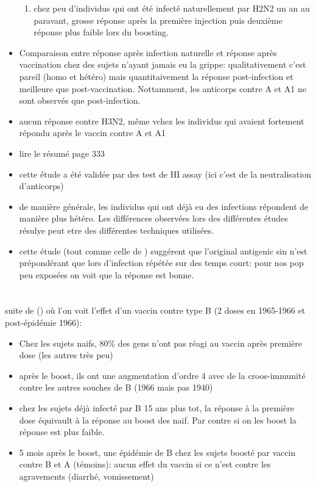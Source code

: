 \documentclass{article}
\begin{document}
\begin{itemize}
\begin{enumerate}
\item chez peu d'individus qui ont été infecté naturellement par H2N2 un an au paravant, grosse réponse après la première injection puis deuxième réponse plus faible lors du boosting.
\end{enumerate}
\item Comparaison entre réponse après infection naturelle et réponse après vaccination chez des sujets n'ayant jamais eu la grippe: qualitativement c'est pareil (homo et hétéro) mais quantitaivement la réponse post-infection et meilleure que post-vaccination. Nottamment, les anticorps contre A et A1 ne sont observés que post-infection.
\item aucun réponse contre H3N2, même vchez les individus qui avaient fortement répondu après le vaccin contre A et A1
\item lire le résumé page 333
\item cette étude a été validée par des test de HI assay (ici c'est de la neutralisation d'anticorps)
\item de manière générale, les individus qui ont déjà eu des infections répondent de manière plus hétéro. Les différences observées lors des différentes études résulye peut etre des différentes techniques utilisées. 
\item cette étude (tout comme celle de \citet{Tyrrell1967}) suggérent que l'original antigenic sin n'est prépondérant que lors d'infection répétée sur des temps court: pour nos pop peu exposées on voit que la réponse est bonne. 
\end{itemize}
 
 \section{\cite{Brown1969b}}
  suite de (\cite{Brown1969a}) où l'on voit l'effet d'un vaccin contre type B (2 doses en 1965-1966 et post-épidémie 1966):
  \begin{itemize}
\item Chez les sujets naifs, 80\% des gens n'ont pas réagi au vaccin après première dose (les autres très peu)
\item après le boost, ils ont une augmentation d'ordre 4 avec de la croos-immunité contre les autres souches de B (1966 mais pas 1940)
\item chez les sujets déjà infecté par B 15 ans plus tot, la réponse à la première dose équivault à la réponse au boost des naif. Par contre si on les boost la réponse est plus faible.
\item 5 mois après le boost, une épidémie de B chez les sujets boosté par vaccin contre B et A (témoins): aucun effet du vaccin si ce n'est contre les agravements (diarrhé, vomissement)
\end{itemize}
\end{document}

